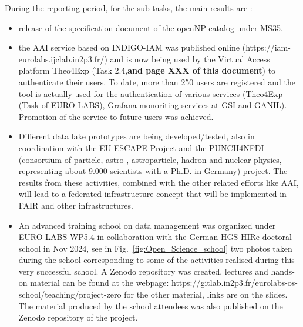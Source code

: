 During the reporting period, for the sub-tasks, the main results are :
\begin{itemize}
    \item  release of the specification document of the openNP catalog under MS35.
    \item the AAI service based on INDIGO-IAM was published online (https://iam-eurolabs.ijclab.in2p3.fr/) and is now being used by the Virtual Access platform Theo4Exp (Task 2.4,\textbf{and page XXX of this document}) to authenticate their users. To date, more than 250 users are registered and the tool is actually used for the authentication of various services (Theo4Exp (Task of EURO-LABS), Grafana monoriting services at GSI and GANIL). Promotion of the service to future users was achieved.
    \item Different data lake prototypes are being developed/tested, also in coordination with the EU ESCAPE Project and the PUNCH4NFDI (consortium of particle, astro-, astroparticle, hadron and nuclear physics, representing about 9.000 scientists with a Ph.D. in Germany) project. The results from these activities, combined with the other related efforts like AAI, will lead to a federated infrastructure concept that will be implemented in FAIR and other infrastructures.
    \item An advanced training school on data management was organized under EURO-LABS WP5.4 in collaboration with the German HGS-HIRe doctoral school in Nov 2024, see in Fig.~\ref{fig:Open_Science_school}    
   two photos taken during the school corresponding to some of the activities realised during this very successful school.  A Zenodo repository was created, lectures and hands-on material can be found at the webpage: https://gitlab.in2p3.fr/eurolabs-os-school/teaching/project-zero for the other material, links are on the slides. The material produced by the school attendees was also published on the Zenodo repository of the project.
\end{itemize}

